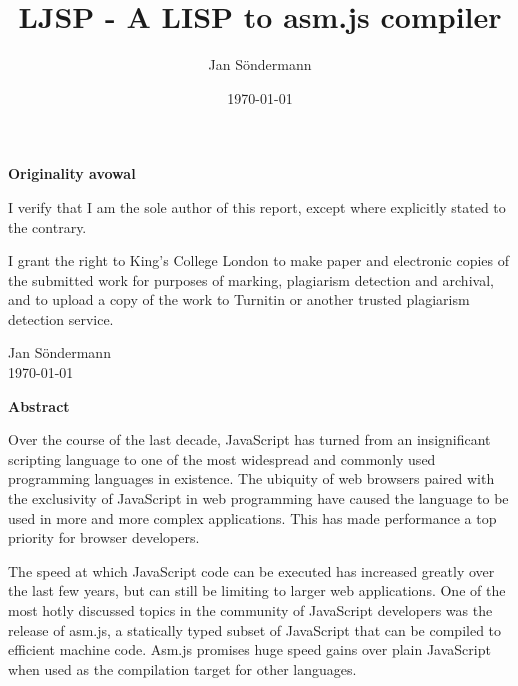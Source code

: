 \documentclass[11pt]{report}
\title{LJSP - A LISP to asm.js compiler}
\author{Jan S\"ondermann}
\date{\today}
\begin{document}


\maketitle

\begin{center}
\textbf{Originality avowal}
\end{center}

I verify that I am the sole author of this report, except where explicitly stated to the contrary.

I grant the right to King's College London to make paper and electronic copies of the submitted work for purposes of marking, plagiarism detection and archival, and to upload a copy of the work to Turnitin or another trusted plagiarism detection service.\\

\begin{flushright}
Jan Söndermann \\
\today
\end{flushright}
\newpage
			
\begin{center}
\textbf{Abstract}
\end{center}

Over the course of the last decade, JavaScript has turned from an insignificant scripting language to one of the most widespread and commonly used programming languages in existence. The ubiquity of web browsers paired with the exclusivity of JavaScript in web programming have caused the language to be used in more and more complex applications. This has made performance a top priority for browser developers.

The speed at which JavaScript code can be executed has increased greatly over the last few years, but can still be limiting to larger web applications. One of the most hotly discussed topics in the community of JavaScript developers was the release of asm.js, a statically typed subset of JavaScript that can be compiled to efficient machine code. Asm.js promises huge speed gains over plain JavaScript when used as the compilation target for other languages.
\end{document}

